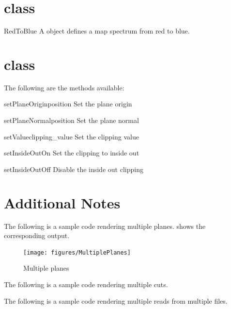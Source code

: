 \section{\RedToBlue class}
\begin{classdesc}{RedToBlue}{}
A \RedToBlue object defines a map spectrum from red to blue.
\end{classdesc}

\section{\Plane class}
The following are the methods available:
\begin{methoddesc}[Plane]{setPlaneOrigin}{position}
Set the plane origin
\end{methoddesc}

\begin{methoddesc}[Plane]{setPlaneNormal}{position}
Set the plane normal
\end{methoddesc}

\begin{methoddesc}[Plane]{setValue}{clipping_value}
Set the clipping value
\end{methoddesc}

\begin{methoddesc}[Plane]{setInsideOutOn}{}
Set the clipping to inside out
\end{methoddesc}

\begin{methoddesc}[Plane]{setInsideOutOff}{}
Disable the inside out clipping
\end{methoddesc}

\section{Additional Notes}
The following is a sample code rendering multiple planes. 
 shows the corresponding output.


\begin{figure}[ht]
\begin{center}
\texttt{[image: figures/MultiplePlanes]}
\end{center}
\caption{Multiple planes}
\label{fig:multipleplanes.1}
\end{figure}

The following is a sample code rendering multiple cuts.



The following is a sample code rendering multiple reads from multiple files.


